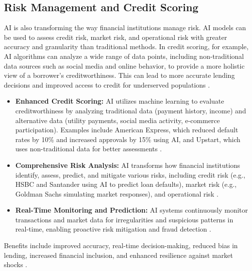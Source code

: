\subsection{Risk Management and Credit Scoring}
AI is also transforming the way financial institutions manage risk. AI models can be used to assess credit risk, market risk, and operational risk with greater accuracy and granularity than traditional methods. In credit scoring, for example, AI algorithms can analyze a wide range of data points, including non-traditional data sources such as social media and online behavior, to provide a more holistic view of a borrower's creditworthiness. This can lead to more accurate lending decisions and improved access to credit for underserved populations \cite{rustandi2025ai}.
\begin{itemize}
    \item \textbf{Enhanced Credit Scoring:} AI utilizes machine learning to evaluate creditworthiness by analyzing traditional data (payment history, income) and alternative data (utility payments, social media activity, e-commerce participation). Examples include American Express, which reduced default rates by 10\% and increased approvals by 15\% using AI, and Upstart, which uses non-traditional data for better assessments \cite{RapidInnovation_CreditScoring, Atriina_CreditScoring}.
    \item \textbf{Comprehensive Risk Analysis:} AI transforms how financial institutions identify, assess, predict, and mitigate various risks, including credit risk (e.g., HSBC and Santander using AI to predict loan defaults), market risk (e.g., Goldman Sachs simulating market responses), and operational risk \cite{Centelli_RiskManagement, DigitalDefynd_RiskManagement}.
    \item \textbf{Real-Time Monitoring and Prediction:} AI systems continuously monitor transactions and market data for irregularities and suspicious patterns in real-time, enabling proactive risk mitigation and fraud detection \cite{Markovate_RiskManagement}.
\end{itemize}
Benefits include improved accuracy, real-time decision-making, reduced bias in lending, increased financial inclusion, and enhanced resilience against market shocks \cite{Finexos_CreditScoring, RiskSeal_CreditScoring}.

